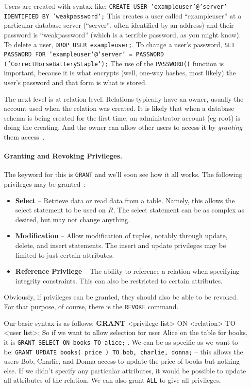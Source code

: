 Users are created with syntax like: \texttt{CREATE USER 'exampleuser'@'server' IDENTIFIED BY 'weakpassword';} This creates a user called ``exampleuser'' at a particular database server (``server'', often identified by an address) and their password is ``weakpassword'' (which is a terrible password, as you might know). To delete a user, \texttt{DROP USER exampleuser;}. To change a user's password, \texttt{SET PASSWORD FOR 'exampleuser'@'server' = PASSWORD ('CorrectHorseBatteryStaple');} The use of the \texttt{PASSWORD()} function is important, because it is what encrypts (well, one-way hashes, most likely) the user's password and that form is what is stored.

The next level is at relation level. Relations typically have an owner, usually the account used when the relation was created. It is likely that when a database schema is being created for the first time, an administrator account (eg root) is doing the creating. And the owner can allow other users to access it by \textit{granting} them access~\cite{fds}. 

\paragraph{Granting and Revoking Privileges.} The keyword for this is \texttt{GRANT} and we'll soon see how it all works. The following privileges may be granted~\cite{fds}:

\begin{itemize}
	\item \textbf{Select} -- Retrieve data or read data from a table. Namely, this allows the select statement to be used on $R$. The select statement can be as complex as desired, but may not change anything.
	\item \textbf{Modification}  -- Allow modification of tuples, notably through update, delete, and insert statements. The insert and update privileges may be limited to just certain attributes.
	\item \textbf{Reference Privilege} -- The ability to reference a relation when specifying integrity constraints. This can also be restricted to certain attributes.
\end{itemize}

Obviously, if privileges can be granted, they should also be able to be revoked. For that purpose, of course, there is the \texttt{REVOKE} command. 

Our basic syntax is as follows: \textbf{GRANT} <privilege list> ON <relation> TO <user list>; So if we want to allow selection for user Alice on the table for books, it is \texttt{GRANT SELECT ON books TO alice;} . We can be as specific as we want to be: \texttt{GRANT UPDATE books( price ) TO bob, charlie, donna;} -- this allows the users Bob, Charlie, and Donna access to update the price of books but nothing else. If we didn't specify any particular attributes, it would be possible to update all attributes of the relation. We can also grant \texttt{ALL} to give all privileges. 

